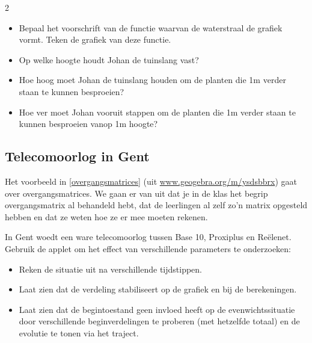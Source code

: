 \begin{multicols}{2}

	\begin{itemize}
	\item Bepaal het voorschrift van de functie waarvan de waterstraal de grafiek vormt. Teken de grafiek van deze functie.
	\item Op welke hoogte houdt Johan de tuinslang vast?
	\item Hoe hoog moet Johan de tuinslang houden om de planten die 1m verder staan te kunnen besproeien?
	\item Hoe ver moet Johan vooruit stappen om de planten die 1m verder staan te kunnen besproeien vanop 1m hoogte?
	\end{itemize}


\subsection{Telecomoorlog in Gent}





Het voorbeeld in \autoref{overgangsmatrices} (uit \url{www.geogebra.org/m/ysdsbbrx}) gaat over overgangsmatrices. We gaan er van uit dat je in de klas het begrip overgangsmatrix al behandeld hebt, dat de leerlingen al zelf zo'n matrix opgesteld hebben en dat ze weten hoe ze er mee moeten rekenen.  

In Gent woedt een ware telecomoorlog tussen Base 10, Proxiplus en Reëlenet. Gebruik de applet om het effect van verschillende parameters te onderzoeken:
\begin{itemize}
\item Reken de situatie uit na verschillende tijdstippen.
\item Laat zien dat de verdeling stabiliseert op de grafiek en bij de berekeningen. 
\item Laat zien dat de begintoestand geen invloed heeft op de evenwichtssituatie door verschillende beginverdelingen te proberen (met hetzelfde totaal) en de evolutie te tonen via het traject.
\end{itemize}

\end{multicols}
 
